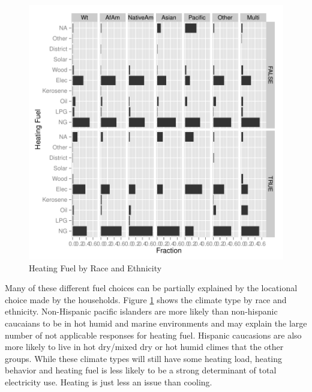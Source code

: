 \documentclass{article}
\begin{document}
\begin{figure}[htbp]
\begin{center}
\caption{Heating Fuel by Race and Ethnicity}
\label{fig:HeatFuel}
\includegraphics{DraftEdwardsWoods-008}
\end{center}
\end{figure}


Many of these different fuel choices can be partially explained by the locational choice made by the households.  Figure \ref{fig:HeatFuel} shows the climate type by race and ethnicity.  Non-Hispanic pacific islanders are more likely than non-hispanic caucaians to be in hot humid and marine environments and may explain the large number of not applicable responses for heating fuel.  Hispanic caucasions are also more likely to live in hot dry/mixed dry or hot humid climes that the other groups.  While these climate types will still have some heating load, heating behavior and heating fuel is less likely to be a strong determinant of total electricity use.  Heating is just less an issue than cooling. 
\end{document}
